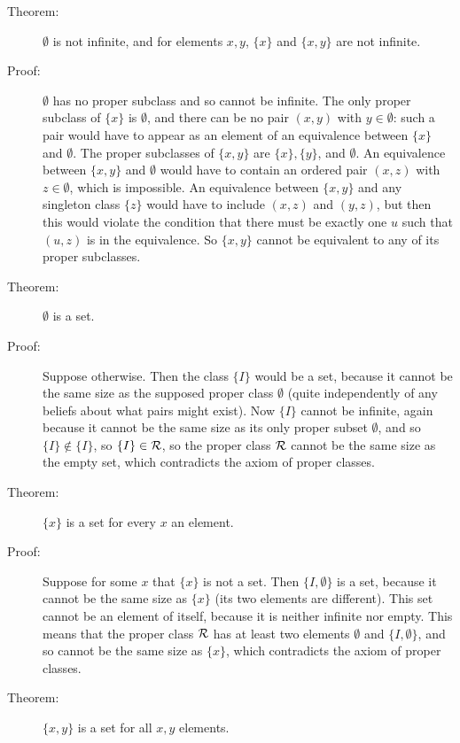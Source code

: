 \documentclass[12pt]{article}
\begin{document}
\begin{description}



\item[Theorem:]  $\emptyset$ is not infinite, and for elements $x,y$, $\{x\}$ and $\{x,y\}$ are not infinite.

\item[Proof:]  $\emptyset$ has no proper subclass and so cannot be infinite.  The only proper subclass of $\{x\}$ is $\emptyset$, and there can be no pair $(x,y)$ with $y \in \emptyset$:  such a pair would have to appear as an element
of an equivalence between $\{x\}$ and $\emptyset$.  The proper subclasses of $\{x,y\}$ are $\{x\}, \{y\}$, and $\emptyset$.  An equivalence between $\{x,y\}$ and $\emptyset$ would have to contain an ordered pair $(x,z)$ with $z \in \emptyset$, which is impossible.
An equivalence between $\{x,y\}$ and any singleton class $\{z\}$ would have to include $(x,z)$ and $(y,z)$, but then this would violate the condition that there must be exactly one $u$ such that $(u,z)$ is in the equivalence.  So $\{x,y\}$ cannot be equivalent to any of its proper subclasses.

\item[Theorem:]  $\emptyset$ is a set.

\item[Proof:]  Suppose otherwise.  Then the class $\{I\}$ would be a set, because it cannot be the same size as the supposed proper class $\emptyset$ (quite independently of any beliefs about what pairs might exist).  Now $\{I\}$ cannot be infinite, again because it cannot be the same size as its only proper subset $\emptyset$, and so $\{I\} \not\in \{I\}$,
so $\{I\} \in \cal R$, so the proper class $\cal R$ cannot be the same size as the empty set, which contradicts the axiom of proper classes.

\item[Theorem:]  $\{x\}$ is a set for every $x$ an element.

\item[Proof:]  Suppose for some $x$ that $\{x\}$ is not a set.  Then $\{I,\emptyset\}$ is a set, because it cannot be the same size as $\{x\}$ (its two elements are different).
This set cannot be an element of itself, because it is neither infinite nor empty.  This means that the proper class $\cal R$ has at least two elements $\emptyset$ and $\{I,\emptyset\}$,
and so cannot be the same size as $\{x\}$, which contradicts the axiom of proper classes.

\item[Theorem:]  $\{x,y\}$ is a set for all $x,y$ elements.


\end{description}
\end{document}
